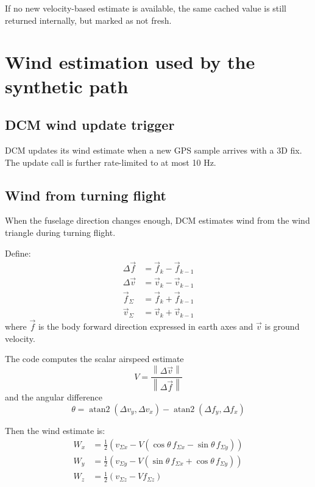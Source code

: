 \documentclass[11pt]{article}
\begin{document}
If no new velocity-based estimate is available, the same cached value is still returned internally, but marked as not fresh.

\section{Wind estimation used by the synthetic path}

\subsection{DCM wind update trigger}

DCM updates its wind estimate when a new GPS sample arrives with a 3D fix. The update call is further rate-limited to at most 10 Hz.

\subsection{Wind from turning flight}

When the fuselage direction changes enough, DCM estimates wind from the wind triangle during turning flight.

Define:
\begin{align}
\Delta \vec{f} &= \vec{f}_k - \vec{f}_{k-1} \\
\Delta \vec{v} &= \vec{v}_k - \vec{v}_{k-1} \\
\vec{f}_{\Sigma} &= \vec{f}_k + \vec{f}_{k-1} \\
\vec{v}_{\Sigma} &= \vec{v}_k + \vec{v}_{k-1}
\end{align}
where $\vec{f}$ is the body forward direction expressed in earth axes and $\vec{v}$ is ground velocity.

The code computes the scalar airspeed estimate
\begin{equation}
V = \frac{\left\lVert \Delta \vec{v} \right\rVert}{\left\lVert \Delta \vec{f} \right\rVert}
\end{equation}
and the angular difference
\begin{equation}
\theta = \operatorname{atan2}(\Delta v_y, \Delta v_x) - \operatorname{atan2}(\Delta f_y, \Delta f_x)
\end{equation}

Then the wind estimate is:
\begin{align}
W_x &= \frac{1}{2}\left(v_{\Sigma x} - V(\cos\theta \, f_{\Sigma x} - \sin\theta \, f_{\Sigma y})\right) \\
W_y &= \frac{1}{2}\left(v_{\Sigma y} - V(\sin\theta \, f_{\Sigma x} + \cos\theta \, f_{\Sigma y})\right) \\
W_z &= \frac{1}{2}\left(v_{\Sigma z} - V f_{\Sigma z}\right)
\end{align}
\end{document}
